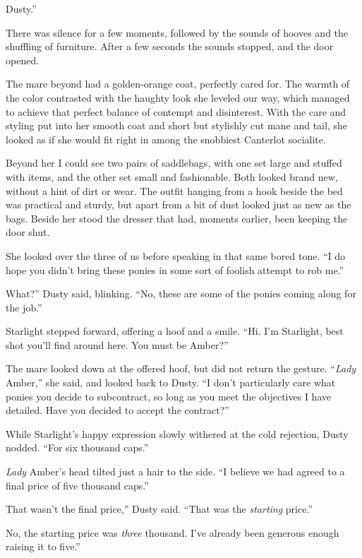 \leavevmode{}Dusty.”

There was silence for a few moments, followed by the sounds of hooves and the shuffling of furniture. After a few seconds the sounds stopped, and the door opened.

The mare beyond had a golden-orange coat, perfectly cared for. The warmth of the color contrasted with the haughty look she leveled our way, which managed to achieve that perfect balance of contempt and disinterest. With the care and styling put into her smooth coat and short but stylishly cut mane and tail, she looked as if she would fit right in among the snobbiest Canterlot socialite.

Beyond her I could see two pairs of saddlebags, with one set large and stuffed with items, and the other set small and fashionable. Both looked brand new, without a hint of dirt or wear. The outfit hanging from a hook beside the bed was practical and sturdy, but apart from a bit of dust looked just as new as the bags. Beside her stood the dresser that had, moments earlier, been keeping the door shut.

She looked over the three of us before speaking in that same bored tone. “I do hope you didn’t bring these ponies in some sort of foolish attempt to rob me.”

\leavevmode{}What?” Dusty said, blinking. “No, these are some of the ponies coming along for the job.”

Starlight stepped forward, offering a hoof and a smile. “Hi. I’m Starlight, best shot you’ll find around here. You must be Amber?”

The mare looked down at the offered hoof, but did not return the gesture. “\textit{Lady} Amber,” she said, and looked back to Dusty. “I don’t particularly care what ponies you decide to subcontract, so long as you meet the objectives I have detailed. Have you decided to accept the contract?”

While Starlight’s happy expression slowly withered at the cold rejection, Dusty nodded. “For six thousand caps.”

\textit{Lady} Amber’s head tilted just a hair to the side. “I believe we had agreed to a final price of five thousand caps.”

\leavevmode{}That wasn’t the final price,” Dusty said. “That was the \textit{starting} price.”

\leavevmode{}No, the starting price was \textit{three} thousand. I’ve already been generous enough raising it to five.”

